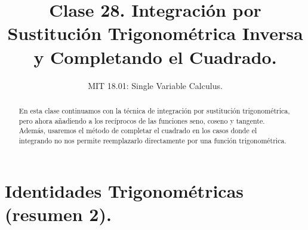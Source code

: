 \documentclass[12pt]{article}
\title{Clase 28. Integración por Sustitución Trigonométrica Inversa y Completando el Cuadrado.}
\author{MIT 18.01: Single Variable Calculus.}
\date{}
\begin{document}
\maketitle

\begin{abstract}
\noindent En esta clase continuamos con la técnica de integración por sustitución trigonométrica, pero ahora añadiendo a los recíprocos de las funciones seno, coseno y tangente. Además, usaremos el método de completar el cuadrado en los casos donde el integrando no nos permite reemplazarlo directamente por una función trigonométrica.
\end{abstract}


\section{Identidades Trigonométricas (resumen 2).}
\end{document}
